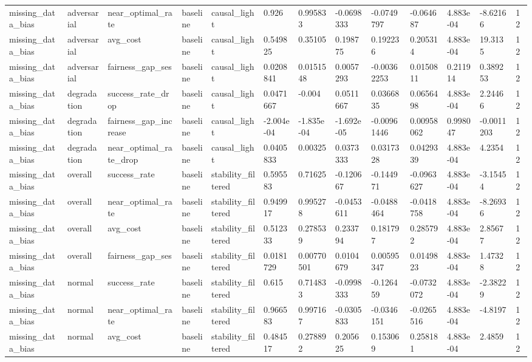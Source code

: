 \begin{tabular}{lllllllllllll}
missing\_data\_bias & adversarial & near\_optimal\_rate & baseline & causal\_light & 0.926 & 0.995833 & -0.0698333 & -0.0749797 & -0.064687 & 4.883e-04 & -8.62166 & 12 \\
missing\_data\_bias & adversarial & avg\_cost & baseline & causal\_light & 0.549825 & 0.35105 & 0.198775 & 0.192236 & 0.205314 & 4.883e-04 & 19.3135 & 12 \\
missing\_data\_bias & adversarial & fairness\_gap\_ses & baseline & causal\_light & 0.0208841 & 0.0151548 & 0.0057293 & -0.00362253 & 0.0150811 & 0.211914 & 0.389253 & 12 \\
missing\_data\_bias & degradation & success\_rate\_drop & baseline & causal\_light & 0.0471667 & -0.004 & 0.0511667 & 0.0366835 & 0.0656498 & 4.883e-04 & 2.24466 & 12 \\
missing\_data\_bias & degradation & fairness\_gap\_increase & baseline & causal\_light & -2.004e-04 & -1.835e-04 & -1.692e-05 & -0.00961446 & 0.00958062 & 0.998047 & -0.0011203 & 12 \\
missing\_data\_bias & degradation & near\_optimal\_rate\_drop & baseline & causal\_light & 0.0405833 & 0.00325 & 0.0373333 & 0.0317328 & 0.0429339 & 4.883e-04 & 4.2354 & 12 \\
missing\_data\_bias & overall & success\_rate & baseline & stability\_filtered & 0.595583 & 0.71625 & -0.120667 & -0.144971 & -0.0963627 & 4.883e-04 & -3.15454 & 12 \\
missing\_data\_bias & overall & near\_optimal\_rate & baseline & stability\_filtered & 0.949917 & 0.995278 & -0.0453611 & -0.0488464 & -0.0418758 & 4.883e-04 & -8.26936 & 12 \\
missing\_data\_bias & overall & avg\_cost & baseline & stability\_filtered & 0.512333 & 0.278539 & 0.233794 & 0.181797 & 0.285792 & 4.883e-04 & 2.85677 & 12 \\
missing\_data\_bias & overall & fairness\_gap\_ses & baseline & stability\_filtered & 0.0181729 & 0.00770501 & 0.0104679 & 0.00595347 & 0.0149823 & 4.883e-04 & 1.47328 & 12 \\
missing\_data\_bias & normal & success\_rate & baseline & stability\_filtered & 0.615 & 0.714833 & -0.0998333 & -0.126459 & -0.0732072 & 4.883e-04 & -2.38229 & 12 \\
missing\_data\_bias & normal & near\_optimal\_rate & baseline & stability\_filtered & 0.966583 & 0.997167 & -0.0305833 & -0.0346151 & -0.0265516 & 4.883e-04 & -4.8197 & 12 \\
missing\_data\_bias & normal & avg\_cost & baseline & stability\_filtered & 0.484517 & 0.278892 & 0.205625 & 0.153069 & 0.258181 & 4.883e-04 & 2.4859 & 12 \\

\end{tabular}
